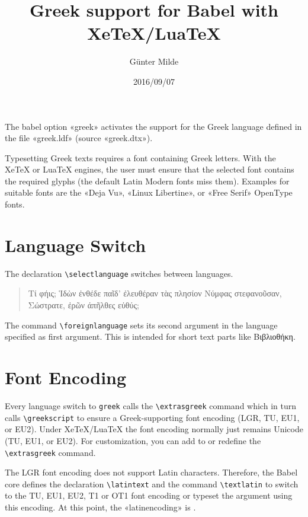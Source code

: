 \documentclass[a4paper]{article}
\begin{document}
\title{Greek support for Babel with XeTeX/LuaTeX}
\author{Günter Milde}
\date{2016/09/07}
\maketitle

The babel option «greek» activates the support for the Greek language
defined in the file «greek.ldf» (source «greek.dtx»).

Typesetting Greek texts requires a font containing Greek letters. With the
XeTeX or LuaTeX engines, the user must ensure that the selected font
contains the required glyphs (the default Latin Modern fonts miss them).
Examples for suitable fonts are the «Deja Vu», «Linux Libertine», or
«Free Serif» OpenType fonts.

\section{Language Switch}

The declaration \verb|\selectlanguage| switches between languages.

\begin{quote}
  Τί φήις; Ἱδὼν ἐνθέδε παῖδ’ ἐλευθέραν
  τὰς πλησίον Νύμφας στεφανοῦσαν, Σώστρατε,
  ἐρῶν άπῆλθες εὐθύς;
\end{quote}

The command \verb|\foreignlanguage| sets its second argument in the language
specified as first argument. This is intended for short text parts like
\foreignlanguage{greek}{Βιβλιοθήκη}.

\section{Font Encoding}

Every language switch to \texttt{greek} calls the \verb|\extrasgreek|
command which in turn calls \verb|\greekscript| to ensure a Greek-supporting
font encoding (LGR, TU, EU1, or EU2). Under XeTeX/LuaTeX the font encoding
normally just remains Unicode (TU, EU1, or EU2). For customization, you can
add to or redefine the \verb|\extrasgreek| command.

The LGR font encoding does not support Latin characters. Therefore, the
Babel core defines the declaration \verb|\latintext| and the command
\verb|\textlatin| to switch to the TU, EU1, EU2, T1 or OT1 font encoding or
typeset the argument using this encoding. At this point, the «latinencoding»
is \latinencoding.
\end{document}
